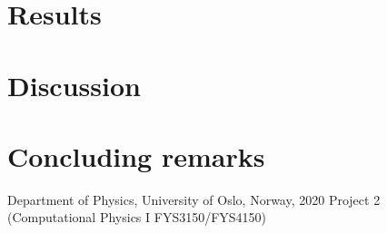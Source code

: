 \documentclass[norsk,a4paper,12pt]{article}
\begin{document}
\section{Results}

\section{Discussion}


\section{Concluding remarks}


\begin{thebibliography}{9}
	Department of Physics, University of Oslo, Norway, 2020 Project 2 (Computational Physics I FYS3150/FYS4150)
\end{thebibliography}
\end{document}
